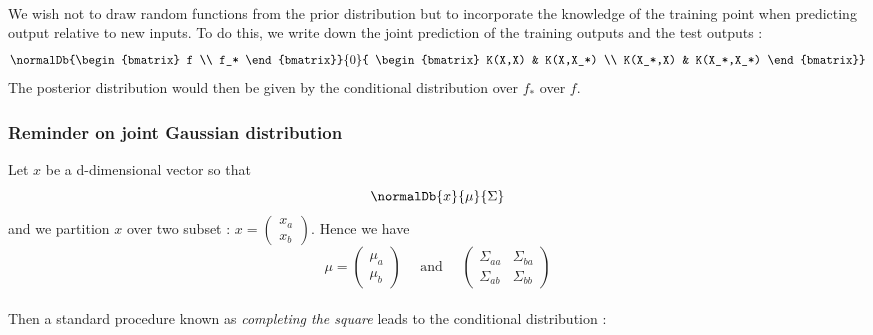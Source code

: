 \documentclass[a4paper]{article}
\begin{document}
{{			\paragraph{} We wish not to draw random functions from the prior distribution but to incorporate the knowledge of the training point when predicting output relative to new inputs. To do this, we write down the joint prediction of the training outputs and the test outputs : 
			\begin{equation}
				\normalDb{\begin{bmatrix} f \\ f_* \end{bmatrix}}{0}{ \begin{bmatrix} K(X,X) & K(X,X_*) \\ K(X_*,X) & K(X_*,X_*) \end{bmatrix}}
			\end{equation}
			The posterior distribution would then be given by the conditional distribution over $f_*$ over $f$. 
			\subsubsection{Reminder on joint Gaussian distribution}
			{
				Let $x$ be a d-dimensional vector so that 
				\begin{equation}
					\normalDb{x}{\mu}{\Sigma}
				\end{equation}
				and we partition $x$ over two subset : $x = \begin{pmatrix} x_a \\ x_b \end{pmatrix}$. Hence we have 
				\begin{equation}
					\mu = \begin{pmatrix} \mu_a \\ \mu_b \end{pmatrix} \quad \text{ and } \quad \begin{pmatrix} \Sigma_{aa} & \Sigma_{ba} \\ \Sigma_{ab} & \Sigma_{bb} \end{pmatrix}
				\end{equation}
				\paragraph{} Then a standard procedure known as \emph{completing the square} leads to the conditional distribution : 
				\vspace{10pt}
			
}}}
\end{document}
